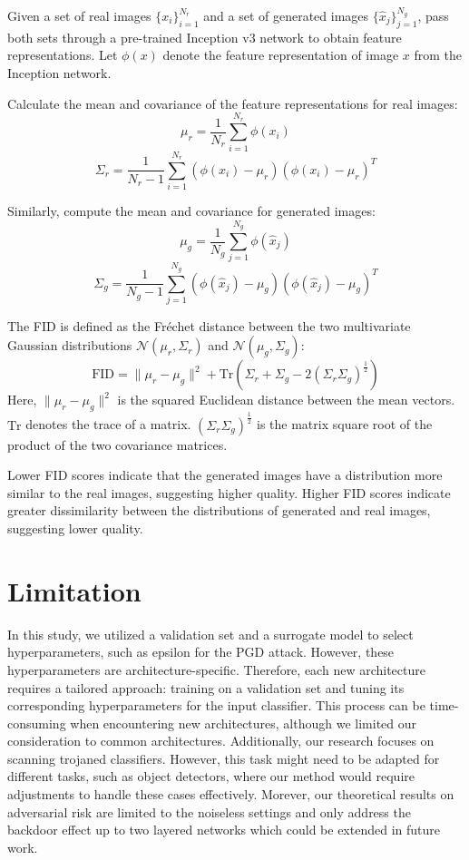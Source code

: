  
 Given a set of real images \( \{x_i\}_{i=1}^{N_r} \) and a set of generated images \( \{\hat{x}_j\}_{j=1}^{N_g} \), pass both sets through a pre-trained Inception v3 network to obtain feature representations. Let \( \phi(x) \) denote the feature representation of image \( x \) from the Inception network.
 

Calculate the mean and covariance of the feature representations for real images:
\[
\mu_r = \frac{1}{N_r} \sum_{i=1}^{N_r} \phi(x_i)
\]
\[
\Sigma_r = \frac{1}{N_r - 1} \sum_{i=1}^{N_r} (\phi(x_i) - \mu_r)(\phi(x_i) - \mu_r)^T
\]

Similarly, compute the mean and covariance for generated images:
\[
\mu_g = \frac{1}{N_g} \sum_{j=1}^{N_g} \phi(\hat{x}_j)
\]
\[
\Sigma_g = \frac{1}{N_g - 1} \sum_{j=1}^{N_g} (\phi(\hat{x}_j) - \mu_g)(\phi(\hat{x}_j) - \mu_g)^T
\]

 

The FID is defined as the Fréchet distance between the two multivariate Gaussian distributions \( \mathcal{N}(\mu_r, \Sigma_r) \) and \( \mathcal{N}(\mu_g, \Sigma_g) \):
\[
\text{FID} = \|\mu_r - \mu_g\|^2 + \text{Tr}(\Sigma_r + \Sigma_g - 2(\Sigma_r \Sigma_g)^{\frac{1}{2}})
\]
Here, \( \|\mu_r - \mu_g\|^2 \) is the squared Euclidean distance between the mean vectors. \( \text{Tr} \) denotes the trace of a matrix. \( (\Sigma_r \Sigma_g)^{\frac{1}{2}} \) is the matrix square root of the product of the two covariance matrices.

 Lower FID scores indicate that the generated images have a distribution more similar to the real images, suggesting higher quality. Higher FID scores indicate greater dissimilarity between the distributions of generated and real images, suggesting lower quality.


\section{Limitation}
\label{sec:limitation}

In this study, we utilized a validation set and a surrogate model to select hyperparameters, such as epsilon for the PGD attack. However, these hyperparameters are architecture-specific. Therefore, each new architecture requires a tailored approach: training on a validation set and tuning its corresponding hyperparameters for the input classifier. This process can be time-consuming when encountering new architectures, although we limited our consideration to common architectures. Additionally, our research focuses on scanning trojaned classifiers. However, this task might need to be adapted for different tasks, such as object detectors, where our method would require adjustments to handle these cases effectively. Morever, our theoretical results on adversarial risk are limited to the noiseless settings and only address the backdoor effect up to two layered networks which could be extended in future work. 




